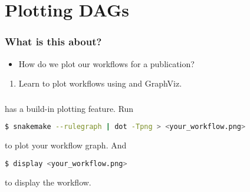 \section{Plotting DAGs}
{   
}

\begin{frame}
  \frametitle{What is this about?}
   \begin{question}[Questions]
   	 \begin{itemize}
       \item How do we plot our workflows for a publication?
     \end{itemize}
   \end{question}
   \begin{docs}[Objectives]
   	  \begin{enumerate} 
                      \item Learn to plot workflows using \Snakemake{} and GraphViz.
      \end{enumerate}
   \end{docs}
\end{frame}

\begin{frame}[fragile]
  \frametitle{}
  \Snakemake{} has a build-in plotting feature. Run 
  \begin{lstlisting}[language=Bash, style=Shell]
$ snakemake --rulegraph | dot -Tpng > <your_workflow.png>
  \end{lstlisting}
  to plot your workflow graph. And
  \begin{lstlisting}[language=Bash, style=Shell]
$ display <your_workflow.png>
  \end{lstlisting}
  to display the workflow.
\end{frame}

